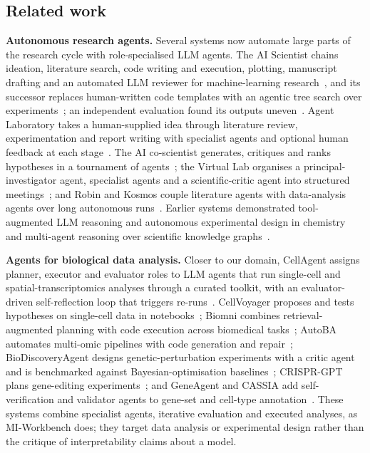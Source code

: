 \subsection*{Related work}

\noindent\textbf{Autonomous research agents.} Several systems now automate large parts of the research cycle with role-specialised LLM agents. The AI Scientist chains ideation, literature search, code writing and execution, plotting, manuscript drafting and an automated LLM reviewer for machine-learning research~\cite{lu2024aiscientist,lu2026aiscientist}, and its successor replaces human-written code templates with an agentic tree search over experiments~\cite{yamada2025aiscientistv2}; an independent evaluation found its outputs uneven~\cite{beel2025evaluating}. Agent Laboratory takes a human-supplied idea through literature review, experimentation and report writing with specialist agents and optional human feedback at each stage~\cite{schmidgall2025agentlab}. The AI co-scientist generates, critiques and ranks hypotheses in a tournament of agents~\cite{gottweis2025coscientist,gottweis2026coscientist}; the Virtual Lab organises a principal-investigator agent, specialist agents and a scientific-critic agent into structured meetings~\cite{swanson2025virtuallab}; and Robin and Kosmos couple literature agents with data-analysis agents over long autonomous runs~\cite{ghareeb2026robin,mitchener2025kosmos}. Earlier systems demonstrated tool-augmented LLM reasoning and autonomous experimental design in chemistry~\cite{bran2024chemcrow,boiko2023autonomous} and multi-agent reasoning over scientific knowledge graphs~\cite{ghafarollahi2024sciagents}.

\noindent\textbf{Agents for biological data analysis.} Closer to our domain, CellAgent assigns planner, executor and evaluator roles to LLM agents that run single-cell and spatial-transcriptomics analyses through a curated toolkit, with an evaluator-driven self-reflection loop that triggers re-runs~\cite{xiao2024cellagent,xiao2026cellagent}. CellVoyager proposes and tests hypotheses on single-cell data in notebooks~\cite{alber2026cellvoyager}; Biomni combines retrieval-augmented planning with code execution across biomedical tasks~\cite{huang2026biomni}; AutoBA automates multi-omic pipelines with code generation and repair~\cite{zhou2024autoba}; BioDiscoveryAgent designs genetic-perturbation experiments with a critic agent and is benchmarked against Bayesian-optimisation baselines~\cite{roohani2025biodiscoveryagent}; CRISPR-GPT plans gene-editing experiments~\cite{qu2025crisprgpt}; and GeneAgent and CASSIA add self-verification and validator agents to gene-set and cell-type annotation~\cite{wang2025geneagent,xie2026cassia}. These systems combine specialist agents, iterative evaluation and executed analyses, as MI-Workbench does; they target data analysis or experimental design rather than the critique of interpretability claims about a model.

